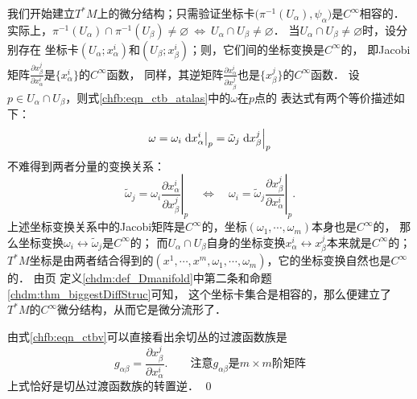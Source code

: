 我们开始建立$T^*M$上的微分结构；只需验证坐标卡$\bigl(\pi^{-1} (U_\alpha),\psi_\alpha\bigr)$是$C^\infty$相容的．
实际上，$\pi^{-1} (U_\alpha) \cap \pi^{-1} (U_\beta) \neq \varnothing \ \Leftrightarrow\ 
U_\alpha \cap U_\beta \neq \varnothing$．
当$U_\alpha \cap U_\beta \neq \varnothing$时，设分别存在
坐标卡$(U_\alpha;x^i_\alpha)$和$(U_\beta;x^i_\beta)$；则，它们间的坐标变换是$C^\infty$的，
即Jacobi矩阵$\frac{\partial {x}^j_\beta}{\partial {x}^i_\alpha}$是$\{x^i_\alpha\}$的$C^\infty$函数，
同样，其逆矩阵$\frac{\partial {x}^i_\alpha}{\partial {x}^j_\beta}$也是$\{{x}^j_\beta\}$的$C^\infty$函数．
设$p \in U_\alpha \cap U_\beta$，则式\eqref{chfb:eqn_ctb_atalas}中的$\omega$在$p$点的
表达式有两个等价描述如下：
\begin{equation*}
    \omega = \omega_i \left. {\rm d}x^i_\alpha \right | _p
    = \tilde{\omega}_j \left. {\rm d}x^j_\beta \right | _p
\end{equation*}
不难得到两者分量的变换关系：
\begin{equation}\label{chfb:eqn_ctbv}
    \tilde{\omega}_j = \omega_i \left. \frac{\partial {x}^i_\alpha}{\partial {x}^j_\beta}  \right | _p
    {\quad \Leftrightarrow \quad}
    \omega_i  = \tilde{\omega}_j \left. \frac{\partial {x}^j_\beta}{\partial {x}^i_\alpha}  \right | _p .
\end{equation}
上述坐标变换关系中的Jacobi矩阵是$C^\infty$的，坐标$(\omega_1,\cdots,\omega_m)$本身也是$C^\infty$的，
那么坐标变换$\omega_i \leftrightarrow \tilde{\omega}_j$是$C^\infty$的；
而$U_\alpha \cap U_\beta$自身的坐标变换$x^i_\alpha \leftrightarrow {x}^j_\beta$本来就是$C^\infty$的；
$T^*M$坐标是由两者结合得到的$(x^1,\cdots,x^m,\omega_1,\cdots,\omega_m)$，它的坐标变换自然也是$C^\infty$的．
由\pageref{chdm:def_Dmanifold}页
定义\ref{chdm:def_Dmanifold}中第二条和命题\ref{chdm:thm_biggestDiffStruc}可知，
这个坐标卡集合是{\kaishu 相容的}，那么便建立了$T^*M$的$C^\infty$微分结构，从而它是微分流形了．

由式\eqref{chfb:eqn_ctbv}可以直接看出余切丛的过渡函数族是
\begin{equation}
    g_{\alpha\beta} = \frac{\partial {x}^j_\beta}{\partial {x}^i_\alpha}  .
    \qquad \text{注意}g_{\alpha\beta}\text{是} m\times m \text{阶矩阵}
\end{equation}
上式恰好是切丛过渡函数族的转置逆．
\qed

